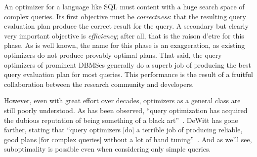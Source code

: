 An optimizer for a language like SQL must content with a huge search space of
complex queries. Its first objective must be {\em correctness}: that the
resulting query evaluation plan produce the correct result for the
query. A secondary but clearly very important objective is {\em efficiency}; after
all, that is the raison d'etre for this phase. As is well known, the name
for this phase is an exaggeration, as existing optimizers do not produce
provably optimal plans. That said, the
query optimizers of prominent DBMSes generally do a superb job of producing
the best query evaluation plan for most queries. This performance is the
result of a fruitful collaboration between the research community and
developers.

However, even with great effort over decades, optimizers as a general class
are still poorly understood. As has been observed, ``query optimization has
acquired the dubious reputation of being something of a black
art''~\cite{Babcock05}. DeWitt has gone farther, stating that ``query
optimizers [do] a terrible job of producing reliable, good plans [for
  complex queries] without a lot of hand
tuning''~\cite[page~59]{winslett02}. And as we'll see, suboptimality is
possible even when considering only simple queries.
